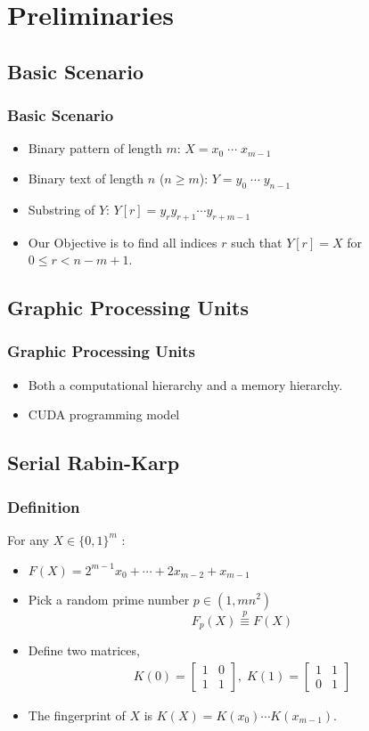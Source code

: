 \section{Preliminaries}

\subsection{Basic Scenario}
\begin{frame}
	\frametitle{Basic Scenario}
	\begin{itemize}
		\setlength\itemsep{1em}
		\item Binary pattern of length $m$: 
			$X = x_0 \; \cdots \; x_{m-1}$
		\item Binary text of length $n$ ($n \ge m$): 
			$Y = y_0 \; \cdots \; y_{n-1}$
		\item Substring of $Y$: $Y[r] = y_r y_{r+1} \cdots y_{r+m-1}$
		\item Our Objective is to find all indices $r$ such that 
			$Y[r] = X$ for $0 \le r < n-m+1$.
	\end{itemize}
\end{frame}

\subsection{Graphic Processing Units}
\begin{frame}
	\frametitle{Graphic Processing Units}
	\begin{itemize}
		\item Both a computational hierarchy and a memory hierarchy.
		\item CUDA programming model
	\end{itemize}
\end{frame}

\subsection{Serial Rabin-Karp}
\begin{frame}
	\frametitle{Definition}
	For any $X \in \{0, 1\}^m$ :
	\begin{itemize}
		\setlength\itemsep{1em}
		\item $F(X) = 2^{m-1} x_0 + \cdots + 2 x_{m-2} + x_{m-1}$
		\item Pick a random prime number $p \in (1, mn^2)$
				$$F_{p}(X) \overset{p}{\equiv} F(X)$$
		\item Define two matrices,
			\begin{align}
				K(0) = \begin{bmatrix}
					1 & 0 \\ 
					1 & 1
					\end{bmatrix}, \;
				K(1) = \begin{bmatrix}
				1 & 1 \\ 
				0 & 1
				\end{bmatrix}
			\end{align}
		\item The fingerprint of $X$ is 
			$K(X) = K(x_0) \cdots K(x_{m-1})$.
	\end{itemize}
\end{frame}

